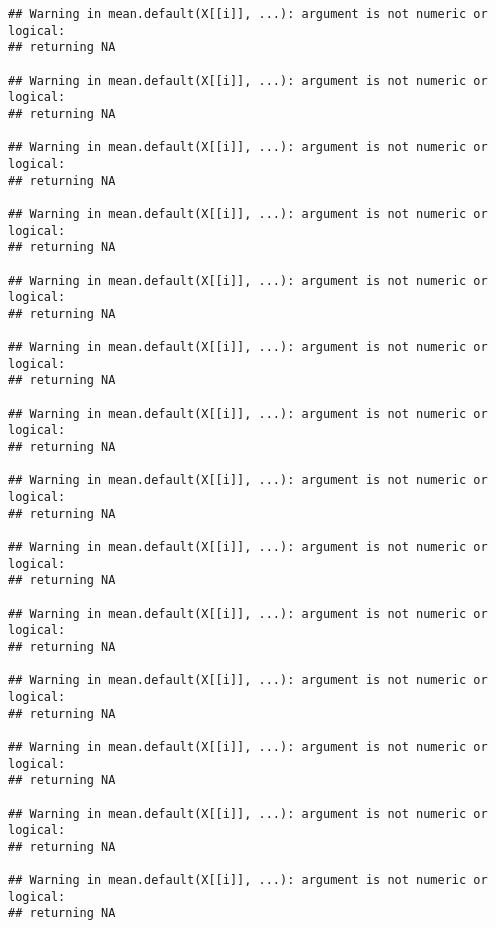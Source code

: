 \documentclass[
]{article}
\begin{document}
\begin{verbatim}
## Warning in mean.default(X[[i]], ...): argument is not numeric or logical:
## returning NA

## Warning in mean.default(X[[i]], ...): argument is not numeric or logical:
## returning NA

## Warning in mean.default(X[[i]], ...): argument is not numeric or logical:
## returning NA

## Warning in mean.default(X[[i]], ...): argument is not numeric or logical:
## returning NA

## Warning in mean.default(X[[i]], ...): argument is not numeric or logical:
## returning NA

## Warning in mean.default(X[[i]], ...): argument is not numeric or logical:
## returning NA

## Warning in mean.default(X[[i]], ...): argument is not numeric or logical:
## returning NA

## Warning in mean.default(X[[i]], ...): argument is not numeric or logical:
## returning NA

## Warning in mean.default(X[[i]], ...): argument is not numeric or logical:
## returning NA

## Warning in mean.default(X[[i]], ...): argument is not numeric or logical:
## returning NA

## Warning in mean.default(X[[i]], ...): argument is not numeric or logical:
## returning NA

## Warning in mean.default(X[[i]], ...): argument is not numeric or logical:
## returning NA

## Warning in mean.default(X[[i]], ...): argument is not numeric or logical:
## returning NA

## Warning in mean.default(X[[i]], ...): argument is not numeric or logical:
## returning NA
\end{verbatim}
\end{document}
